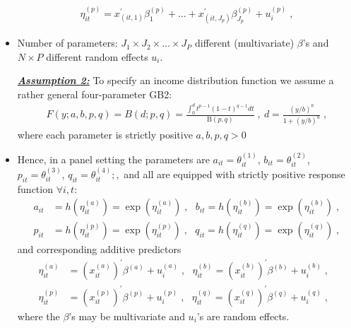 \documentclass[a4paper,12pt]{scrartcl} %
\begin{document}
\begin{itemize}
\begin{align*}
\eta_{it}^{(p)}=x_{(it,1)}^{\prime}\beta_1^{(p)}+
\ldots+x_{(it,J_p)}^{\prime}
\beta_{J_p}^{(p)}+u_i^{(p)}\;,
\end{align*}
\item Number of parameters: $J_1 \times J_2\times\ldots \times J_P$ different (multivariate) $\beta$'s and $N\times P$ different random effects $u_i$.
\item[\underline{\textbf{\textit{Assumption 2:}}}] To specify an  income distribution function we assume a rather general four-parameter GB2:
\begin{align*}
F(y;a,b,p,q)=B(d;p,q)=\frac{\int_{0}^d t^{p-1}(1-t)^{q-1}dt}{\text{B}(p,q)}\;,~d=\frac{(y/b)^a}{1+(y/b)^a}\;,
\end{align*}
where each parameter is strictly positive  $a,b,p,q>0$
%
%
%
%
%
\clearpage
%
%
%
%
%
\item Hence, in a panel setting the parameters are  $a_{it}=\theta_{it}^{(1)}$, $b_{it}=\theta_{it}^{(2)}$, $p_{it}=\theta_{it}^{(3)}$, $q_{it}=\theta_{it}^{(4)};,$ and all are equipped with strictly positive response function $\forall i,t:$ 
\begin{align*}
a_{it}&=h\left(\eta_{it}^{(a)}\right)=
\exp\left(\eta_{it}^{(a)}\right)\;,~~~b_{it}=h\left(\eta_{it}^{(b)}\right)=
\exp\left(\eta_{it}^{(b)}\right)\;,\\
p_{it}&=h\left(\eta_{it}^{(p)}\right)=
\exp\left(\eta_{it}^{(p)}\right)\;,~~~q_{it}=h\left(\eta_{it}^{(q)}\right)=
\exp\left(\eta_{it}^{(q)}\right)\;,
\end{align*}
and corresponding additive predictors
\begin{align*}
\eta_{it}^{(a)}&=\left(x_{it}^{(a)}\right)^{\prime}\beta^{(a)} + u_i^{(a)}\;,~~~
\eta_{it}^{(b)}=\left(x_{it}^{(b)}\right)^{\prime}\beta^{(b)} + u_i^{(b)}\;,~~~\\
\eta_{it}^{(p)}&=\left(x_{it}^{(p)}\right)^{\prime}\beta^{(p)} + u_i^{(p)}\;,~~~
\eta_{it}^{(q)}=\left(x_{it}^{(q)}\right)^{\prime}\beta^{(q)} + u_i^{(q)}\;,
\end{align*}
where the $\beta$'s may be multivariate and $u_i$'s are random effects.
\end{itemize}
\end{document}
